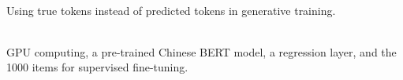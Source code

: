 \begin{quiz}
  ~\\
  Using true tokens instead of predicted tokens in generative training.
\end{quiz}

\begin{quiz}
  ~\\
  GPU computing, a pre-trained Chinese BERT model, a regression
  layer, and the 1000 items for supervised fine-tuning.
\end{quiz}
